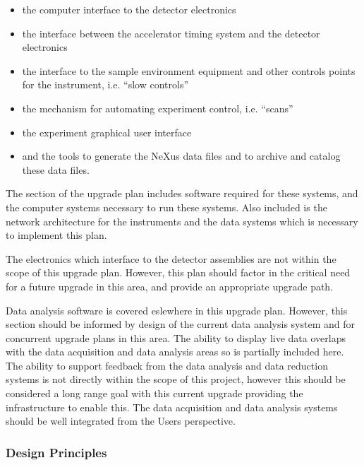 \begin{itemize}

\item the computer interface to the detector electronics

\item the interface between the accelerator timing system and the
detector electronics

\item the interface to the sample environment equipment and other controls
points for the instrument, i.e. ``slow controls''

\item the mechanism for automating experiment control, i.e. ``scans''

\item the experiment graphical user interface 

\item and the tools to generate the NeXus data files and to archive and
catalog these data files.

\end{itemize}

The section of the upgrade plan includes software required for these
systems, and the computer systems necessary to run these systems. Also
included is the network architecture for the instruments and the data
systems which is necessary to implement this plan.

The electronics which interface to the detector assemblies are not
within the scope of this upgrade plan. However, this plan should factor
in the critical need for a future upgrade in this area, and provide an
appropriate upgrade path.

Data analysis software is covered eslewhere in this upgrade plan.
However, this section should be informed by design of the current data
analysis system and for concurrent upgrade plans in this area. The ability
to display live data overlaps with the data acquisition and data analysis
areas so is partially included here. The ability to support feedback from
the data analysis and data reduction systems is not directly within the
scope of this project, however this should be considered a long range goal
with this current upgrade providing the infrastructure to enable this.
The data acquisition and data analysis systems should be well integrated
from the Users perspective.

\subsubsection{Design Principles}


